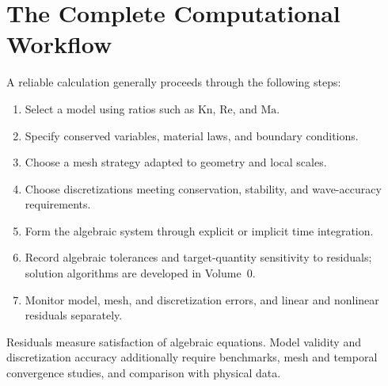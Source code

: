 \section{The Complete Computational Workflow}
A reliable calculation generally proceeds through the following steps:

\begin{enumerate}
  \item Select a model using ratios such as \(\mathrm{Kn}\), \(\mathrm{Re}\), and \(\mathrm{Ma}\).
  \item Specify conserved variables, material laws, and boundary conditions.
  \item Choose a mesh strategy adapted to geometry and local scales.
  \item Choose discretizations meeting conservation, stability, and wave-accuracy requirements.
  \item Form the algebraic system through explicit or implicit time integration.
  \item Record algebraic tolerances and target-quantity sensitivity to residuals; solution algorithms are developed in Volume~0.
  \item Monitor model, mesh, and discretization errors, and linear and nonlinear residuals separately.
\end{enumerate}

Residuals measure satisfaction of algebraic equations. Model validity and discretization accuracy additionally require benchmarks, mesh and temporal convergence studies, and comparison with physical data.

